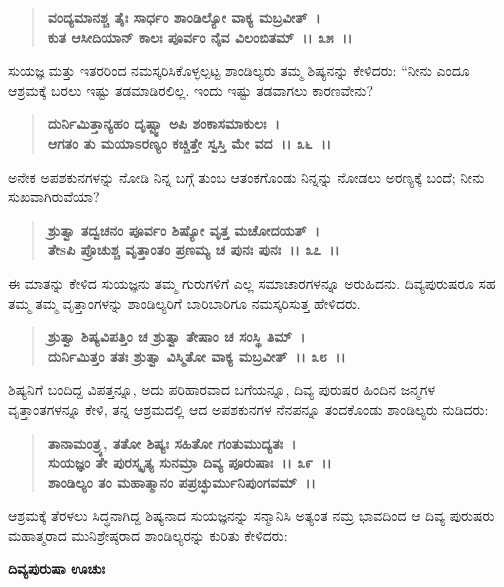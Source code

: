 \begin{verse}
\textbf{ವಂದ್ಯಮಾನಶ್ಚ ತೈಃ ಸಾರ್ಧಂ ಶಾಂಡಿಲ್ಯೋ ವಾಕ್ಯ ಮಬ್ರವೀತ್~।}\\\textbf{ಕುತ ಆಸೀದಿಯಾನ್ ಕಾಲಃ ಪೂರ್ವಂ ನೈವ ವಿಲಂಬಿತಮ್~।। ೩೫~।।}
\end{verse}

ಸುಯಜ್ಞ ಮತ್ತು ಇತರರಿಂದ ನಮಸ್ಕರಿಸಿಕೊಳ್ಳಲ್ಪಟ್ಟ ಶಾಂಡಿಲ್ಯರು ತಮ್ಮ ಶಿಷ್ಯನನ್ನು ಕೇಳಿದರು: “ನೀನು ಎಂದೂ ಆಶ್ರಮಕ್ಕೆ ಬರಲು ಇಷ್ಟು ತಡಮಾಡಿರಲಿಲ್ಲ. ಇಂದು ಇಷ್ಟು ತಡ\-ವಾಗಲು ಕಾರಣವೇನು?

\begin{verse}
\textbf{ದುರ್ನಿಮಿತ್ತಾನ್ಯಹಂ ದೃಷ್ಟ್ವಾ ಅಪಿ ಶಂಕಾಸಮಾಕುಲಃ~।}\\\textbf{ಆಗತಂ ತು ಮಯಾಽರಣ್ಯಂ ಕಚ್ಚಿತ್ತೇ ಸ್ವಸ್ತಿ ಮೇ ವದ~।। ೩೬~।।}
\end{verse}

ಅನೇಕ ಅಪಶಕುನಗಳನ್ನು ನೋಡಿ ನಿನ್ನ ಬಗ್ಗೆ ತುಂಬ ಆತಂಕಗೊಂಡು ನಿನ್ನನ್ನು ನೋಡಲು ಅರಣ್ಯಕ್ಕೆ ಬಂದೆ; ನೀನು ಸುಖವಾಗಿರುವೆಯಾ?

\begin{verse}
\textbf{ಶ್ರುತ್ವಾ ತದ್ವಚನಂ ಪೂರ್ವಂ ಶಿಷ್ಯೋ ವೃತ್ತ ಮಚೋದಯತ್~।}\\\textbf{ತೇsಪಿ ಪ್ರೊಚುಶ್ಚ ವೃತ್ತಾಂತಂ ಪ್ರಣಮ್ಯ ಚ ಪುನಃ ಪುನಃ~।। ೩೭~।।}
\end{verse}

ಈ ಮಾತನ್ನು ಕೇಳಿದ ಸುಯಜ್ಞನು ತಮ್ಮ ಗುರುಗಳಿಗೆ ಎಲ್ಲ ಸಮಾಚಾರಗಳನ್ನೂ ಅರುಹಿದನು. ದಿವ್ಯಪುರುಷರೂ ಸಹ ತಮ್ಮ ತಮ್ಮ ವೃತ್ತಾಂಗಳನ್ನು ಶಾಂಡಿಲ್ಯರಿಗೆ ಬಾರಿಬಾರಿಗೂ ನಮಸ್ಕರಿಸುತ್ತ ಹೇಳಿದರು.

\begin{verse}
\textbf{ಶ್ರುತ್ವಾ ಶಿಷ್ಯವಿಪತ್ತಿಂ ಚ ಶ್ರುತ್ವಾ ತೇಷಾಂ ಚ ಸಂಸ್ಥಿ ತಿಮ್~।}\\\textbf{ದುರ್ನಿಮಿತ್ತಂ ತತಃ ಶ್ರುತ್ವಾ ವಿಸ್ಮಿತೋ ವಾಕ್ಯ ಮಬ್ರವೀತ್~।। ೩೮~।।}
\end{verse}

ಶಿಷ್ಯನಿಗೆ ಬಂದಿದ್ದ ವಿಪತ್ತನ್ನೂ, ಅದು ಪರಿಹಾರವಾದ ಬಗೆಯನ್ನೂ, ದಿವ್ಯ ಪುರುಷರ ಹಿಂದಿನ ಜನ್ಮಗಳ ವೃತ್ತಾಂತಗಳನ್ನೂ ಕೇಳಿ, ತನ್ನ ಆಶ್ರಮದಲ್ಲಿ ಆದ ಅಪಶಕುನಗಳ ನೆನಪನ್ನೂ ತಂದಕೊಂಡು ಶಾಂಡಿಲ್ಯರು ನುಡಿದರು:

\begin{verse}
\textbf{ತಾನಾಮಂತ್ರ್ಯ, ತತೋ ಶಿಷ್ಯಃ ಸಹಿತೋ ಗಂತುಮುದ್ಯತಃ~।}\\\textbf{ಸುಯಜ್ಞಂ ತೇ ಪುರಸ್ಕೃತ್ಯ ಸುನಮ್ರಾ ದಿವ್ಯ ಪೂರುಷಾಃ~।। ೩೯~।।}\\\textbf{ಶಾಂಡಿಲ್ಯಂ ತಂ ಮಹಾತ್ಮಾನಂ ಪಪ್ರಚ್ಛುರ್ಮುನಿಪುಂಗವಮ್~।।}
\end{verse}

ಆಶ್ರಮಕ್ಕೆ ತೆರಳಲು ಸಿದ್ಧನಾಗಿದ್ದ ಶಿಷ್ಯನಾದ ಸುಯಜ್ಞನನ್ನು ಸನ್ಮಾನಿಸಿ ಅತ್ಯಂತ ನಮ್ರ ಭಾವದಿಂದ ಆ ದಿವ್ಯ ಪುರುಷರು ಮಹಾತ್ಮರಾದ ಮುನಿಶ್ರೇಷ್ಠರಾದ ಶಾಂಡಿಲ್ಯರನ್ನು ಕುರಿತು ಕೇಳಿದರು:

\begin{flushleft}
\textbf{ದಿವ್ಯಪುರುಷಾ ಊಚುಃ}
\end{flushleft}

